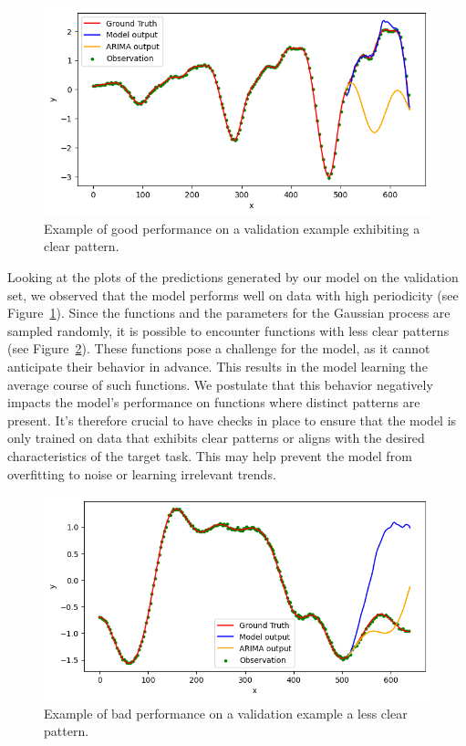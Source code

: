 \documentclass{article}
\theoremstyle{plain}
\theoremstyle{definition}
\theoremstyle{remark}
\begin{document}
\begin{figure}[h!]
    \centering
    \includegraphics[width=\linewidth]{assets/validation1.png}
    \caption{Example of good performance on a validation example exhibiting a clear pattern.}
    \label{fig:validation1}
\end{figure}
Looking at the plots of the predictions generated by our model on the validation set, we observed that the model performs well on data with high periodicity (see Figure~\ref{fig:validation1}). Since the functions and the parameters for the Gaussian process are sampled randomly, it is possible to encounter functions with less clear patterns (see Figure~\ref{fig:validation2}). These functions pose a challenge for the model, as it cannot anticipate their behavior in advance. This results in the model learning the average course of such functions. We postulate that this behavior negatively impacts the model's performance on functions where distinct patterns are present. It's therefore crucial to have checks in place to ensure that the model is only trained on data that exhibits clear patterns or aligns with the desired characteristics of the target task. This may help prevent the model from overfitting to noise or learning irrelevant trends.

 
\begin{figure}[h!]
    \centering
    \includegraphics[width=\linewidth]{assets/validation2.png}
    \caption{Example of bad performance on a validation example a less clear pattern.}    \label{fig:validation2}
\end{figure}
\end{document}

